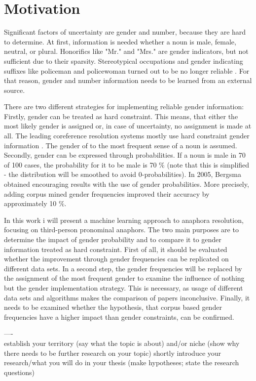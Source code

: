 \section{Motivation}
Significant factors of uncertainty are gender and number, because they are hard to determine. At first, information is needed whether a noun is male, female, neutral, or plural. Honorifics like "Mr." and "Mrs." are gender indicators, but not sufficient due to their sparsity. Stereotypical occupations and gender indicating suffixes like policeman and policewoman turned out to be no longer reliable \citep{evans2000improving}. For that reason, gender and number information needs to be learned from an external source. 

There are two different strategies for implementing reliable gender information: \\
Firstly, gender can be treated as hard constraint. This means, that either the most likely gender is assigned or, in case of uncertainty, no assignment is made at all. The leading coreference resolution systems mostly use hard constraint gender information \citep{soon2001machine}. The gender of to the most frequent sense of a noun is assumed.\\
Secondly, gender can be expressed through probabilities. If a noun is male in 70 of 100 cases, the probability for it to be male is 70 \% (note that this is simplified - the distribution will be smoothed to avoid 0-probabilities). In \nocite{bergsma2005automatic} 2005, Bergsma obtained encouraging results with the use of gender probabilities. More precisely, adding corpus mined gender frequencies improved their accuracy by approximately 10 \%.

In this work i will present a machine learning approach to anaphora resolution, focusing on third-person pronominal anaphors. The two main purposes are to determine the impact of gender probability and to compare it to gender information treated as hard constraint. First of all, it should be evaluated whether the improvement through gender frequencies can be replicated on different data sets. In a second step, the gender frequencies will be replaced by the assignment of the most frequent gender to examine the influence of nothing but the gender implementation strategy. This is necessary, as usage of different data sets and algorithms makes the comparison of papers inconclusive. Finally, it needs to be examined whether the hypothesis, that corpus based gender frequencies have a higher impact than gender constraints, can be confirmed.




----\\
establish your territory (say what the topic is about) and/or niche (show why there needs to be further research on your topic)
shortly introduce your research/what you will do in your thesis (make hypotheses; state the research questions)


